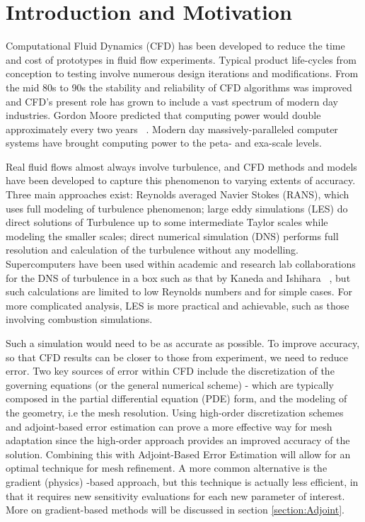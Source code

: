 \section{Introduction and Motivation}

Computational Fluid Dynamics (CFD) has been developed to reduce the time and cost of prototypes in fluid flow experiments. Typical product life-cycles from conception to testing involve numerous design iterations and modifications. From the mid 80s to 90s the stability and reliability of CFD algorithms was improved and CFD's present role has grown to include a vast spectrum of modern day industries. Gordon Moore predicted that computing power would double approximately every two years ~\cite{intel:2005}. Modern day massively-paralleled computer systems have brought computing power to the peta- and exa-scale levels.\par

Real fluid flows almost always involve turbulence, and CFD methods and models have been developed to capture this phenomenon to varying extents of accuracy. Three main approaches exist: Reynolds averaged Navier Stokes (RANS), which uses full modeling of turbulence phenomenon; large eddy simulations (LES) do direct solutions of Turbulence up to some intermediate Taylor scales while modeling the smaller scales; direct numerical simulation (DNS) performs full resolution and calculation of the turbulence without any modelling. Supercomputers have been used within academic and research lab collaborations for the DNS of turbulence in a box such as that by Kaneda and Ishihara ~\cite{kaneda:2006}, but such calculations are limited to low Reynolds numbers and for simple cases. For more complicated analysis, LES is more practical and achievable, such as those involving combustion simulations.\par 

Such a simulation would need to be as accurate as possible. To improve accuracy, so that CFD results can be closer to those from experiment, we need to reduce error. Two  key sources of error within CFD include the discretization of the governing equations (or the general numerical scheme) - which are typically composed in the partial differential equation (PDE) form, and the modeling of the geometry, i.e the mesh resolution. Using high-order discretization schemes and adjoint-based error estimation can prove a more effective way for mesh adaptation since the high-order approach provides an improved accuracy of the solution. Combining this with Adjoint-Based Error Estimation will allow for an optimal technique for mesh refinement. A more common alternative is the gradient (physics) -based approach, but this technique is actually less efficient, in that it requires new sensitivity evaluations for each new parameter of interest. More on gradient-based methods will be discussed in section \ref{section:Adjoint}. \par 